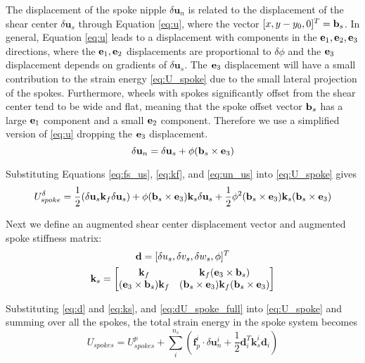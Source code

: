 \documentclass[\rootdir/thesis.tex]{subfiles}
\begin{document}
The displacement of the spoke nipple $\delta\mathbf{u}_n$ is related to the displacement of the shear center $\delta\mathbf{u}_s$ through Equation \eqref{eq:u}, where the vector $[x,y-y_0,0]^T = \mathbf{b}_s$. In general, Equation \eqref{eq:u} leads to a displacement with components in the $\mathbf{e}_1,\mathbf{e}_2,\mathbf{e}_3$ directions, where the $\mathbf{e}_1,\mathbf{e}_2$ displacements are proportional to $\delta\phi$ and the $\mathbf{e}_3$ displacement depends on gradients of $\delta\mathbf{u}_s$. The $\mathbf{e}_3$ displacement will have a small contribution to the strain energy \eqref{eq:U_spoke} due to the small lateral projection of the spokes. Furthermore, wheels with spokes significantly offset from the shear center tend to be wide and flat, meaning that the spoke offset vector $\mathbf{b}_s$ has a large $\mathbf{e}_1$ component and a small $\mathbf{e}_2$ component. Therefore we use a simplified version of \eqref{eq:u} dropping the $\mathbf{e}_3$ displacement.
\begin{equation}
\label{eq:un_us}
\delta\mathbf{u}_n = \delta\mathbf{u}_s + \phi (\mathbf{b}_s \times \mathbf{e}_3)
\end{equation}

Substituting Equations \eqref{eq:fs_us}, \eqref{eq:kf}, and \eqref{eq:un_us} into \eqref{eq:U_spoke} gives
\begin{equation}
\label{eq:dU_spoke_full}
U_{spoke}^{\delta} = \frac{1}{2}(\delta\mathbf{u}_s \mathbf{k}_f \delta\mathbf{u}_s) +
    \phi(\mathbf{b}_s\times\mathbf{e}_3)\mathbf{k}_s\delta\mathbf{u}_s +
    \frac{1}{2}\phi^2(\mathbf{b}_s\times\mathbf{e}_3)\mathbf{k}_s(\mathbf{b}_s\times\mathbf{e}_3)
\end{equation}

Next we define an augmented shear center displacement vector and augmented spoke stiffness matrix:
\begin{gather}
\mathbf{d} = [\delta u_s, \delta v_s, \delta w_s, \phi]^T\label{eq:d}\\
\mathbf{k}_s =
\begin{bmatrix}
\mathbf{k}_f                & \mathbf{k}_f (\mathbf{e}_3\times\mathbf{b}_s)\\
(\mathbf{e}_3\times\mathbf{b}_s) \mathbf{k}_f & (\mathbf{b}_s\times\mathbf{e}_3)\mathbf{k}_f(\mathbf{b}_s\times\mathbf{e}_3)
\end{bmatrix}\label{eq:ks}
\end{gather}

Substituting \eqref{eq:d} and \eqref{eq:ks}, and \eqref{eq:dU_spoke_full} into \eqref{eq:U_spoke} and summing over all the spokes, the total strain energy in the spoke system becomes
\begin{equation}
\label{eq:U_spokes}
U_{spokes} = U_{spokes}^p + \sum_i^{n_s} \left(\mathbf{f}_p^i \cdot \delta\mathbf{u}_n^i +
    \frac{1}{2}\mathbf{d}_i^T \mathbf{k}_s^i \mathbf{d}_i\right)
\end{equation}
\end{document}
